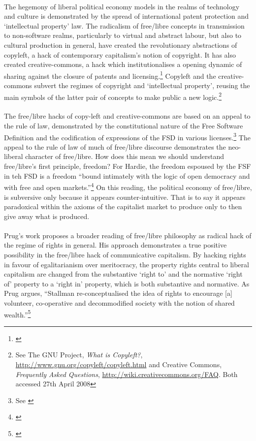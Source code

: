 \documentclass[11pt,titlepage]{book}
\begin{document}
\paragraph{}The hegemony of liberal political economy models in the realms of technology and culture is demonstrated by the spread of international patent protection and `intellectual property' law. The radicalism of free/libre concepts in transmission to non-software realms, particularly to virtual and abstract labour, but also to cultural production in general, have created the revolutionary abstractions of copyleft, a hack of contemporary capitalism's notion of copyright. It has also created creative-commons, a hack which institutionalises a opening dynamic of sharing against the closure of patents and licensing.\footnote{\cite[17m32sec]{moore:2002rv}} Copyleft and the creative-commons subvert the regimes of copyright and `intellectual property', reusing the main symbols of the latter pair of concepts to make public a new logic.\footnote{See The GNU Project, \textit{What is Copyleft?}, \url{http://www.gnu.org/copyleft/copyleft.html} and Creative Commons, \textit{Frequently Asked Questions}, \url{http://wiki.creativecommons.org/FAQ}. Both accessed 27th April 2008}

\paragraph{}The free/libre hacks of copy-left and creative-commons are based on an appeal to the rule of law, demonstrated by the constitutional nature of the Free Software Definition and the codification of expressions of the FSD in various licenses.\footnote{See \cite[Chapter 1, \textit{Open Source Licensing, Contract, and Copyright Law}]{Laurent:2004}} The appeal to the rule of law of much of free/libre discourse demonstrates the neo-liberal character of free/libre. How does this mean we should understand free/libre's first principle, freedom? For Hardie, the freedom espoused by the FSF in teh FSD is a freedom ``bound intimately with the logic of open democracy and with free and open markets.''\footnote{\cite[p. 2]{Hardie:2005px}} On this reading, the political economy of free/libre, is subversive only because it appears counter-intuitive. That is to say it appears paradoxical within the axioms of the capitalist market to produce only to then give away what is produced.

\paragraph{}Prug's work proposes a broader reading of free/libre philosophy as radical hack of the regime of rights in general. His approach demonstrates a true positive possibility in the free/libre hack of communicative capitalism. By hacking rights in favour of egalitarianism over meritocracy, the property rights central to liberal capitalism are changed from the substantive `right to' and the normative `right of' property to a `right in' property, which is both substantive and normative. As Prug argues, ``Stallman re-conceptualised the idea of rights to encourage [a] volunteer, co-operative and decommodified society with the notion of shared wealth.''\footnote{\cite{Prug:2007fs}}
\end{document}
